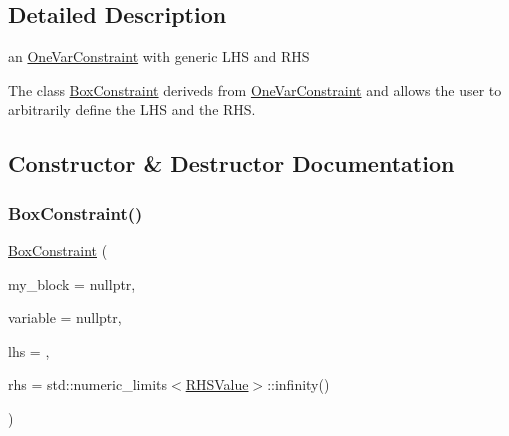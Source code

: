 \subsection{Detailed Description}
an \mbox{\hyperlink{class_s_m_spp__di__unipi__it_1_1_one_var_constraint}{One\+Var\+Constraint}} with generic L\+HS and R\+HS 

The class \mbox{\hyperlink{class_s_m_spp__di__unipi__it_1_1_box_constraint}{Box\+Constraint}} deriveds from \mbox{\hyperlink{class_s_m_spp__di__unipi__it_1_1_one_var_constraint}{One\+Var\+Constraint}} and allows the user to arbitrarily define the L\+HS and the R\+HS. 

\subsection{Constructor \& Destructor Documentation}
\mbox{\label{class_s_m_spp__di__unipi__it_1_1_box_constraint_ae033132828040ea2942dbbb91cd5e6ef}} 
\subsubsection{\texorpdfstring{Box\+Constraint()}{BoxConstraint()}}
{\footnotesize\ttfamily \mbox{\hyperlink{class_s_m_spp__di__unipi__it_1_1_box_constraint}{Box\+Constraint}} (\begin{DoxyParamCaption}\item[{\mbox{\hyperlink{class_s_m_spp__di__unipi__it_1_1_block}{Block}} $\ast$}]{my\+\_\+block = {\ttfamily nullptr},  }\item[{\mbox{\hyperlink{class_s_m_spp__di__unipi__it_1_1_col_variable}{Col\+Variable}} $\ast$const}]{variable = {\ttfamily nullptr},  }\item[{\mbox{\hyperlink{class_s_m_spp__di__unipi__it_1_1_row_constraint_a34abd4b01d3a2024be5f6d13dd88779f}{c\+\_\+\+R\+H\+S\+Value}}}]{lhs = {},  }\item[{\mbox{\hyperlink{class_s_m_spp__di__unipi__it_1_1_row_constraint_a34abd4b01d3a2024be5f6d13dd88779f}{c\+\_\+\+R\+H\+S\+Value}}}]{rhs = {\ttfamily std\+:\+:numeric\+\_\+limits$<$\mbox{\hyperlink{class_s_m_spp__di__unipi__it_1_1_row_constraint_a8813536ab3b13a81c8e83a999ade3bd8}{R\+H\+S\+Value}}$>$\+:\+:infinity()} }\end{DoxyParamCaption})\hspace{0.3cm}{\ttfamily [inline]}}



